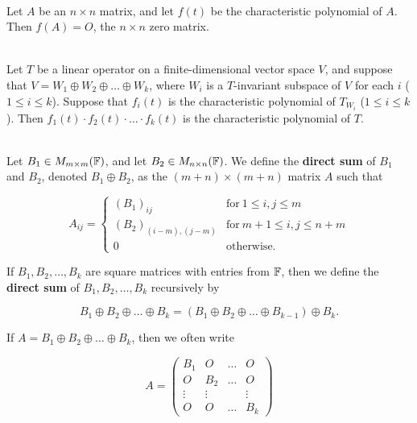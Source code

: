 \begin{corollary}
	\hfill\\
	Let $A$ be an $n \times n$ matrix, and let $f(t)$ be the characteristic polynomial of $A$. Then $f(A) = O$, the $n \times n$ zero matrix.
\end{corollary}

\begin{theorem}
	\hfill\\
	Let $T$ be a linear operator on a finite-dimensional vector space $V$, and suppose that $V = W_1 \oplus W_2 \oplus \dots \oplus W_k$, where $W_i$ is a $T$-invariant subspace of $V$ for each $i$ ($1 \leq i \leq k$). Suppose that $f_i(t)$ is the characteristic polynomial of $T_{W_i}$ ($1 \leq i \leq k$). Then $f_1(t)\cdot f_2(t) \cdot \dots \cdot f_k(t)$ is the characteristic polynomial of $T$.
\end{theorem}

\begin{definition}
	\hfill\\
	Let $B_1 \in M_{m \times m}(\mathbb{F})$, and let $B_2 \in M_{n \times n}(\mathbb{F})$. We define the \textbf{direct sum} of $B_1$ and $B_2$, denoted $B_1 \oplus B_2$, as the $(m + n) \times (m + n)$ matrix $A$ such that

	\[A_{ij} = \begin{cases}
			(B_1)_{ij}          & \text{for}\ 1 \leq i, j \leq m         \\
			(B_2)_{(i-m),(j-m)} & \text{for}\ m + 1 \leq i, j \leq n + m \\
			0                   & \text{otherwise.}
		\end{cases}\]

	If $B_1, B_2, \dots, B_k$ are square matrices with entries from $\mathbb{F}$, then we define the \textbf{direct sum} of $B_1, B_2, \dots, B_k$ recursively by

	\[B_1 \oplus B_2 \oplus \dots \oplus B_k = (B_1 \oplus B_2 \oplus \dots \oplus B_{k-1})\oplus B_k.\]

	If $A= B_1 \oplus B_2 \oplus \dots \oplus B_k$, then we often write

	\[A = \begin{pmatrix}
			B_1    & O      & \dots & O      \\
			O      & B_2    & \dots & O      \\
			\vdots & \vdots &       & \vdots \\
			O      & O      & \dots & B_k
		\end{pmatrix}\]
\end{definition}

